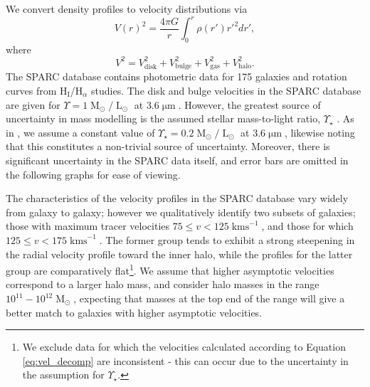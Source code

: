 \documentclass{pasa}%
\begin{document}
We convert  density profiles to velocity distributions \cite{Sofue:2008wt} via 
%
\begin{equation}
    V(r)^2 = \frac{4\pi G}{r}\int_0^r \rho(r')r'^2 dr',
\end{equation}
where 
\begin{equation}\label{eq:vel_decomp}
    V^2 = V_{\mathrm{disk}}^2 + V_{\mathrm{bulge}}^2 + V_{\mathrm{gas}}^2 + V_{\mathrm{halo}}^2.
\end{equation}
%
The SPARC database contains photometric data for 175 galaxies and rotation curves from $\mathrm{H}_{\mathrm{I}}$/$\mathrm{H}_{\alpha}$ studies. The disk and bulge velocities in the SPARC database are given for $\Upsilon = 1 \operatorname{M}_{\odot}/\operatorname{L}_{\odot}$ at $3.6\operatorname{\mu m}$. However, the greatest source of uncertainty in mass modelling is the assumed stellar mass-to-light ratio, $\Upsilon_\star$ \cite{Lelli:2016zqa}. As in \cite{Robles:2018fur}, we  assume a constant value of $\Upsilon_\star = 0.2 \operatorname{M}_{\odot}/\operatorname{L}_{\odot}$ at $3.6\operatorname{\mu m}$, likewise noting that  this constitutes a non-trivial source of uncertainty. Moreover, there is significant uncertainty in the SPARC data itself, and error bars are omitted in the following graphs for ease of viewing. 

The characteristics of the velocity profiles in the SPARC database vary widely from galaxy to galaxy; however we qualitatively identify two subsets of galaxies; those with maximum tracer velocities $75 \leq v < 125\operatorname{kms}^{-1}$, and those for which $125 \leq v < 175\operatorname{kms}^{-1}$. The former group tends to exhibit a strong steepening in the radial velocity profile toward the inner halo, while the  profiles for the latter group are comparatively flat\footnote{We exclude data for which the velocities calculated according to Equation \ref{eq:vel_decomp} are inconsistent - this can occur due to the uncertainty in the assumption for $\Upsilon_\star$.}. We assume that higher asymptotic velocities correspond to a larger halo mass, and consider halo masses in the range $10^{11} - 10^{12} \operatorname{M}_{\odot}$, expecting that masses at the top end of the range will give a better match to galaxies with higher asymptotic velocities. 
\end{document}

